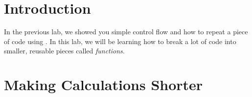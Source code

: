 \documentclass[11pt]{cselabheader}
\begin{document}
\tableofcontents

\pagebreak
{}

\section{Introduction}
\label{sec:intro}

In the previous lab, we showed you simple control flow and how to repeat a piece
of code using . In this lab, we will be learning how to
break a lot of code into smaller, reusable pieces called \emph{functions}.

\section{Making Calculations Shorter}
\label{sec:calc}
\end{document}
